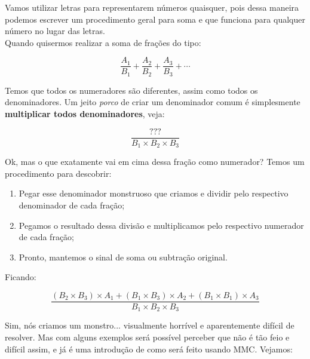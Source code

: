 \newpage
\begin{tcolorbox}[title = Procedimento para Soma de Frações]
    Vamos utilizar letras para representarem números quaisquer, pois dessa maneira podemos escrever um procedimento geral para soma e que funciona para qualquer número no lugar das letras.\\
    
    Quando quisermos realizar a soma de frações do tipo:

    \begin{equation}
        \frac{A_1}{B_1}+\frac{A_2}{B_2}+\frac{A_3}{B_3}+\cdots
    \end{equation}

    Temos que todos os numeradores são diferentes, assim como todos os denominadores. Um jeito \textit{porco} de criar um denominador comum é simplesmente \textbf{multiplicar todos denominadores}, veja:

    \begin{equation}
        \frac{???}{B_1 \times B_2 \times B_3}
    \end{equation}

    Ok, mas o que exatamente vai em cima dessa fração como numerador? Temos um procedimento para descobrir:
    
    \begin{enumerate}
        \item Pegar esse denominador monstruoso que criamos e dividir pelo respectivo denominador de cada fração;
        \item Pegamos o resultado dessa divisão e multiplicamos pelo respectivo numerador de cada fração;
        \item Pronto, mantemos o sinal de soma ou subtração original.
    \end{enumerate} 

    Ficando:

    \begin{equation}
        \frac{(B_2\times B_3)\times A_1+(B_1\times B_3)\times A_2 + (B_1\times B_1) \times A_3}{B_1\times B_2 \times B_3}
    \end{equation}
\end{tcolorbox}

Sim, nós criamos um monstro... visualmente horrível e aparentemente difícil de resolver. Mas com alguns exemplos será possível perceber que não é tão feio e difícil assim, e já é uma introdução de como será feito usando MMC. Vejamos:

